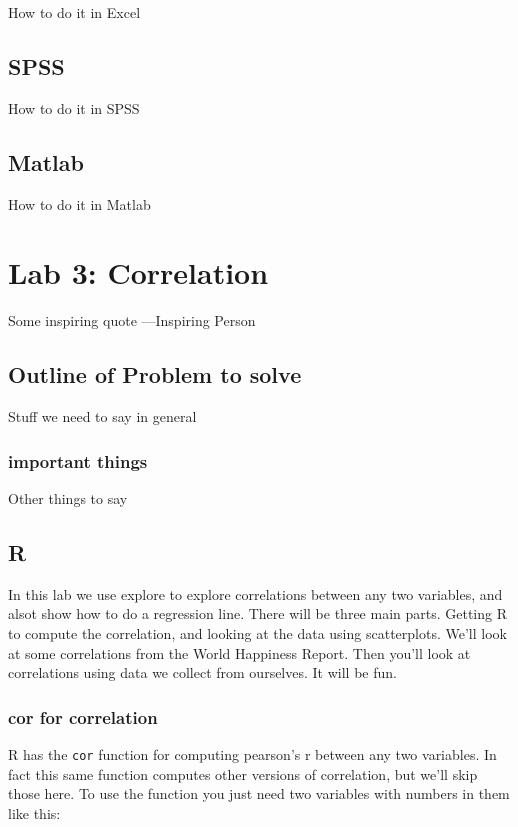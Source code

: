 \documentclass[]{book}
\theoremstyle{definition}
\theoremstyle{definition}
\theoremstyle{definition}
\theoremstyle{remark}
\begin{document}
How to do it in Excel

\section{SPSS}\label{spss-1}

How to do it in SPSS

\section{Matlab}\label{matlab-1}

How to do it in Matlab

\chapter{Lab 3: Correlation}\label{lab-3-correlation}

{ Some inspiring quote ---Inspiring Person }

\section{Outline of Problem to
solve}\label{outline-of-problem-to-solve-1}

Stuff we need to say in general

\subsection{important things}\label{important-things-1}

Other things to say

\section{R}\label{r-3}

In this lab we use explore to explore correlations between any two
variables, and alsot show how to do a regression line. There will be
three main parts. Getting R to compute the correlation, and looking at
the data using scatterplots. We'll look at some correlations from the
World Happiness Report. Then you'll look at correlations using data we
collect from ourselves. It will be fun.

\subsection{cor for correlation}\label{cor-for-correlation}

R has the \texttt{cor} function for computing pearson's r between any
two variables. In fact this same function computes other versions of
correlation, but we'll skip those here. To use the function you just
need two variables with numbers in them like this:
\end{document}
